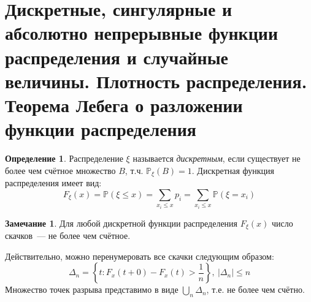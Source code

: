 \documentclass[oneside,final,14pt]{extreport}
\theoremstyle{plain}
\theoremstyle{definition}
\newtheorem*{defn}{Определение}
\newtheorem*{rmrk}{Замечание}
\theoremstyle{named}
\begin{document}
\section{Дискретные, сингулярные и абсолютно непрерывные функции распределения и случайные величины. Плотность распределения. Теорема Лебега о разложении функции распределения}

\begin{defn}
    Распределение $\xi$ называется {\it дискретным}, если существует не более чем счётное множество $B$, т.ч. $\mathbb{P}_\xi(B) = 1$. Дискретная функция распределения имеет вид:
    \begin{equation*}
        F_\xi(x) = \mathbb{P}(\xi \leqslant x) = \sum\limits_{x_i \leqslant x}{}p_{i} = \sum\limits_{x_i \leqslant x}{}\mathbb{P}(\xi = x_{i})
    \end{equation*}
\end{defn}

\begin{rmrk}
    Для любой дискретной функции распределения $F_\xi(x)$ число скачков~--- не более чем счётное.
    
    Действительно, можно перенумеровать все скачки следующим образом:
    \begin{equation*}
        \Delta_{n}=\left\{t : F_{x}(t+0)-F_{x}(t)>\frac{1}{n}\right\},~ |\Delta_{n} | \leqslant n
    \end{equation*}
    Множество точек разрыва представимо в виде $\bigcup\limits_{n} \Delta_{n}$, т.е. не более чем счётно.
\end{rmrk}
\end{document}
